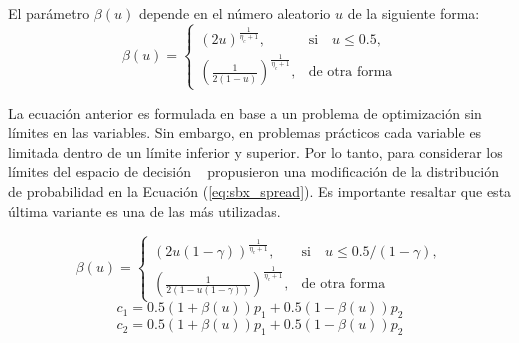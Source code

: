 El parámetro $\beta(u)$ depende en el número aleatorio $u$ de la siguiente forma:
\begin{equation}
    \beta(u)= 
\begin{cases}
     (2u)^{\frac{1}{\eta_c+1}},& \text{si} \quad u \leq 0.5,\\
     	(\frac{1}{2(1-u)})^{\frac{1}{\eta_c +1}} ,& \text{de otra forma}
\end{cases}
\end{equation}

La ecuación anterior es formulada en base a un problema de optimización sin límites en las variables.
%
Sin embargo, en problemas prácticos cada variable es limitada dentro de un límite inferior y superior.
%
Por lo tanto, para considerar los límites del espacio de decisión ~\cite{deb1999self} propusieron una modificación de la distribución de probabilidad en la Ecuación (\ref{eq:sbx_spread}).
%
Es importante resaltar que esta última variante es una de las más utilizadas.

%
\begin{equation} \label{eq:sbx_spread}
    \beta(u)= 
\begin{cases}
     (2u(1-\gamma))^{\frac{1}{\eta_c+1}},& \text{si} \quad u \leq 0.5/(1-\gamma),\\
     	(\frac{1}{2(1-u(1-\gamma))})^{\frac{1}{\eta_c +1}} ,& \text{de otra forma}
\end{cases}
\end{equation}
\begin{equation} \label{eq:child_1}
c_1 = 0.5(1 + \beta(u))p_1 + 0.5(1-\beta(u))p_2
\end{equation}
\begin{equation} \label{eq:child_2}
c_2 = 0.5(1 + \beta(u))p_1 + 0.5(1-\beta(u))p_2
\end{equation}

